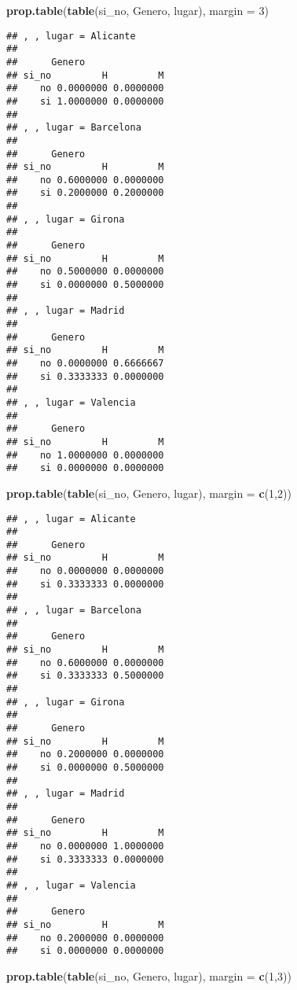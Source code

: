 \documentclass[]{article}
\newenvironment{Shaded}{\begin{snugshade}}{\end{snugshade}}
\newcommand{\DataTypeTok}[1]{\textcolor[rgb]{0.13,0.29,0.53}{#1}}
\newcommand{\DecValTok}[1]{\textcolor[rgb]{0.00,0.00,0.81}{#1}}
\newcommand{\KeywordTok}[1]{\textcolor[rgb]{0.13,0.29,0.53}{\textbf{#1}}}
\newcommand{\NormalTok}[1]{#1}
\begin{document}
\begin{Shaded}
\begin{Highlighting}[]
\KeywordTok{prop.table}\NormalTok{(}\KeywordTok{table}\NormalTok{(si_no, Genero, lugar), }\DataTypeTok{margin =} \DecValTok{3}\NormalTok{)}
\end{Highlighting}
\end{Shaded}

\begin{verbatim}
## , , lugar = Alicante
## 
##      Genero
## si_no         H         M
##    no 0.0000000 0.0000000
##    si 1.0000000 0.0000000
## 
## , , lugar = Barcelona
## 
##      Genero
## si_no         H         M
##    no 0.6000000 0.0000000
##    si 0.2000000 0.2000000
## 
## , , lugar = Girona
## 
##      Genero
## si_no         H         M
##    no 0.5000000 0.0000000
##    si 0.0000000 0.5000000
## 
## , , lugar = Madrid
## 
##      Genero
## si_no         H         M
##    no 0.0000000 0.6666667
##    si 0.3333333 0.0000000
## 
## , , lugar = Valencia
## 
##      Genero
## si_no         H         M
##    no 1.0000000 0.0000000
##    si 0.0000000 0.0000000
\end{verbatim}

\begin{Shaded}
\begin{Highlighting}[]
\KeywordTok{prop.table}\NormalTok{(}\KeywordTok{table}\NormalTok{(si_no, Genero, lugar), }\DataTypeTok{margin =} \KeywordTok{c}\NormalTok{(}\DecValTok{1}\NormalTok{,}\DecValTok{2}\NormalTok{))}
\end{Highlighting}
\end{Shaded}

\begin{verbatim}
## , , lugar = Alicante
## 
##      Genero
## si_no         H         M
##    no 0.0000000 0.0000000
##    si 0.3333333 0.0000000
## 
## , , lugar = Barcelona
## 
##      Genero
## si_no         H         M
##    no 0.6000000 0.0000000
##    si 0.3333333 0.5000000
## 
## , , lugar = Girona
## 
##      Genero
## si_no         H         M
##    no 0.2000000 0.0000000
##    si 0.0000000 0.5000000
## 
## , , lugar = Madrid
## 
##      Genero
## si_no         H         M
##    no 0.0000000 1.0000000
##    si 0.3333333 0.0000000
## 
## , , lugar = Valencia
## 
##      Genero
## si_no         H         M
##    no 0.2000000 0.0000000
##    si 0.0000000 0.0000000
\end{verbatim}

\begin{Shaded}
\begin{Highlighting}[]
\KeywordTok{prop.table}\NormalTok{(}\KeywordTok{table}\NormalTok{(si_no, Genero, lugar), }\DataTypeTok{margin =} \KeywordTok{c}\NormalTok{(}\DecValTok{1}\NormalTok{,}\DecValTok{3}\NormalTok{))}
\end{Highlighting}
\end{Shaded}
\end{document}
